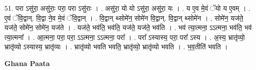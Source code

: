 \documentclass[17pt]{extarticle}
\begin{document}
51. परा ऽसु॑रा॒ असु॑राः॒ परा॒ परा ऽसु॑राः । . असु॑रा॒ यो यो ऽसु॑रा॒ असु॑रा॒ यः । . य ए॒व मे॒वं ॅयो य ए॒वम् । . ए॒वं ॅवि॒द्वान्. वि॒द्वा ने॒व मे॒वं ॅवि॒द्वान् । . वि॒द्वान् थ्सोमे॑न॒ सोमे॑न वि॒द्वान्. वि॒द्वान् थ्सोमे॑न । . सोमे॑न॒ यज॑ते॒ यज॑ते॒ सोमे॑न॒ सोमे॑न॒ यज॑ते । . यज॑ते॒ भव॑ति॒ भव॑ति॒ यज॑ते॒ यज॑ते॒ भव॑ति । . भव॑ त्या॒त्मना॒ ऽऽत्मना॒ भव॑ति॒ भव॑ त्या॒त्मना᳚ । . आ॒त्मना॒ परा॒ परा॒ ऽऽत्मना॒ ऽऽत्मना॒ परा᳚ । . परा᳚ ऽस्यास्य॒ परा॒ परा᳚ ऽस्य । . अ॒स्य॒ भ्रातृ॑व्यो॒ भ्रातृ॑व्यो ऽस्यास्य॒ भ्रातृ॑व्यः । . भ्रातृ॑व्यो भवति भवति॒ भ्रातृ॑व्यो॒ भ्रातृ॑व्यो भवति । . भ॒व॒तीति॑ भवति । \newline

\textbf{Ghana Paata } \newline
\end{document}
